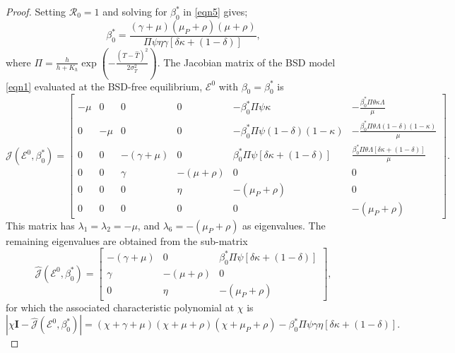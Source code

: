 \documentclass[10pt,a4paper]{amsart}
\newcommand\bfI{\mathbf{I}}
\begin{document}
\begin{proof}
    Setting $\mathcal{R}_0=1$ and solving for $\beta_0^*$ in \eqref{eqn5} gives;
    \begin{equation}\label{eqn7}
        \beta_0^*=\frac{(\gamma+\mu)(\mu_P+\rho)(\mu+\rho)}{\Pi\psi\eta\gamma[\delta\kappa+(1-\delta)]},
    \end{equation}
    where $\Pi=\frac{h}{h+K_h}\exp{\left(-\frac{(T-\hat{T})^2}{2\sigma_T^2}\right)}$. The Jacobian matrix of the BSD model \eqref{eqn1} evaluated at the BSD-free equilibrium, $\mathcal{E}^0$ with $\beta_0=\beta_0^*$ is
    \begin{equation}\label{eqn8}
        \mathcal{J}(\mathcal{E}^0,\beta_0^*)=
        \begin{bmatrix}
            -\mu&0&0&0&-\beta_0^*\Pi\psi\kappa&-\frac{\beta_0^*\Pi\theta\kappa\Lambda}{\mu}\\
            0&-\mu&0&0&-\beta_0^*\Pi\psi(1-\delta)(1-\kappa)&-\frac{\beta_0^*\Pi\theta\Lambda(1-\delta)(1-\kappa)}{\mu}\\
            0&0&-(\gamma+\mu)&0&\beta_0^*\Pi\psi[\delta\kappa+(1-\delta)]&\frac{\beta_0^*\Pi\theta\Lambda[\delta\kappa+(1-\delta)]}{\mu}\\
            0&0&\gamma&-(\mu+\rho)&0&0\\
            0&0&0&\eta&-(\mu_P+\rho)&0\\
            0&0&0&0&0&-(\mu_P+\rho)
        \end{bmatrix}.
    \end{equation}
    This matrix has $\lambda_1=\lambda_2=-\mu$, and $\lambda_6=-(\mu_P+\rho)$ as eigenvalues. The remaining eigenvalues are obtained from the sub-matrix
    \begin{equation}\label{eqn9}
        \hat{\mathcal{J}}(\mathcal{E}^0,\beta_0^*)=
        \begin{bmatrix}
            -(\gamma+\mu)&0&\beta_0^*\Pi\psi[\delta\kappa+(1-\delta)]\\
            \gamma&-(\mu+\rho)&0\\
            0&\eta&-(\mu_P+\rho)
        \end{bmatrix},
    \end{equation}
    for which the associated characteristic polynomial at $\chi$ is
    \begin{equation}
        |\chi\bfI-\hat{\mathcal{J}}(\mathcal{E}^0,\beta_0^*)|=(\chi+\gamma+\mu)(\chi+\mu+\rho)(\chi+\mu_P+\rho)-\beta_0^*\Pi\psi\gamma\eta[\delta\kappa+(1-\delta)].
    \end{equation}

\end{proof}
\end{document}
